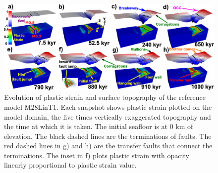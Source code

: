 \begin{figure}[h]
  \centering
    \includegraphics[width=1.0\textwidth]{./Figures/fig_Results_1_reference_model.eps}
  \caption[Reference model M28LinT1.]{Evolution of plastic strain and surface topography of the reference model M28LinT1. Each snapshot shows plastic strain plotted on the model domain, the five times vertically exaggerated topography and the time at which it is taken. The initial seafloor is at 0 km of elevation. The black dashed lines are the terminations of faults. The red dashed lines in g) and h) are the transfer faults that connect the terminations. The inset in f) plots plastic strain with opacity linearly proportional to plastic strain value.}%
 \label{fig_Results1_1}
\end{figure}   

